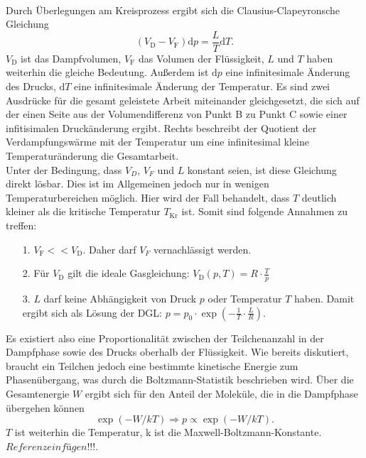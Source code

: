 \\
Durch Überlegungen am Kreisprozess ergibt sich die Clausius-Clapeyronsche Gleichung 
\begin{equation}
    (V_\text{D}-V_\text{F})\text{d}p=\frac{L}{T}\text{d}T.
\end{equation}
$V_\text{D}$ ist das Dampfvolumen, $V_\text{F}$ das Volumen der Flüssigkeit, $L$ und $T$ haben weiterhin die gleiche Bedeutung.
Außerdem ist $\text{d}p$ eine infinitesimale Änderung des Drucks, $\text{d}T$ eine infinitesimale Änderung der Temperatur.
Es sind zwei Ausdrücke für die gesamt geleistete Arbeit miteinander gleichgesetzt, 
die sich auf der einen Seite aus der Volumendifferenz von Punkt B zu Punkt C sowie einer infitisimalen
Druckänderung ergibt.
Rechts beschreibt der Quotient der Verdampfungswärme mit der Temperatur um eine infinitesimal kleine
Temperaturänderung die Gesamtarbeit.\\
Unter der Bedingung, dass $V_D$, $V_F$ und $L$ konstant seien, ist diese Gleichung direkt lösbar. Dies ist im
Allgemeinen jedoch nur in wenigen Temperaturbereichen möglich. Hier wird der Fall behandelt, dass $T$ deutlich kleiner
als die kritische Temperatur $T_\text{Kr}$ ist.
\newpage \noindent
Somit sind folgende Annahmen zu treffen:
\begin{itemize}
    \item[1.] $V_\text{F}<<V_\text{D}$. Daher darf $V_F$ vernachlässigt werden.
    \item[2.] Für $V_\text{D}$ gilt die ideale Gasgleichung: $V_\text{D}(p,T)=R\cdot\frac{T}{p}$
    \item[3.] $L$ darf keine Abhängigkeit von Druck $p$ oder Temperatur $T$ haben. Damit
    ergibt sich als Lösung der DGL: $p=p_0\cdot \exp(-\frac{1}{T}\cdot\frac{L}{R})$.
\end{itemize}
Es existiert also eine Proportionalität zwischen der Teilchenanzahl in der Dampfphase sowie
des Drucks oberhalb der Flüssigkeit. Wie bereits diskutiert, braucht ein Teilchen jedoch eine bestimmte
kinetische Energie zum Phasenübergang, was durch die Boltzmann-Statistik beschrieben wird.
Über die Gesamtenergie $W$ ergibt sich für den Anteil der Moleküle, die in die Dampfphase übergehen können
\begin{equation*}
\exp(-W/kT)\Rightarrow p\propto \exp(-W/kT).
\end{equation*}
$T$ ist weiterhin die Temperatur, k ist die Maxwell-Boltzmann-Konstante. $Referenz einfügen!!!$.